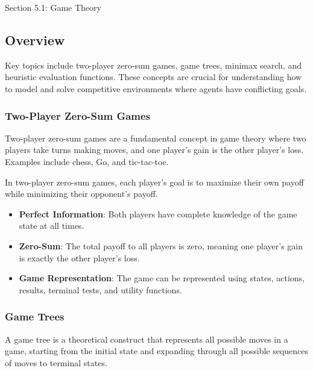 \begin{notes}{Section 5.1: Game Theory}
    \subsection*{Overview}

    Key topics include two-player zero-sum games, game trees, minimax search, and heuristic evaluation functions. These concepts are crucial for understanding how to model and solve competitive environments 
    where agents have conflicting goals.
    
    \subsubsection*{Two-Player Zero-Sum Games}
    
    Two-player zero-sum games are a fundamental concept in game theory where two players take turns making moves, and one player's gain is the other player's loss. Examples include chess, Go, and tic-tac-toe.
    
    \begin{highlight}
        In two-player zero-sum games, each player's goal is to maximize their own payoff while minimizing their opponent's payoff.
        
        \begin{itemize}
            \item \textbf{Perfect Information}: Both players have complete knowledge of the game state at all times.
            \item \textbf{Zero-Sum}: The total payoff to all players is zero, meaning one player's gain is exactly the other player's loss.
            \item \textbf{Game Representation}: The game can be represented using states, actions, results, terminal tests, and utility functions.
        \end{itemize}
    \end{highlight}
    
    \subsubsection*{Game Trees}
    
    A game tree is a theoretical construct that represents all possible moves in a game, starting from the initial state and expanding through all possible sequences of moves to terminal states.
    

\end{notes}
